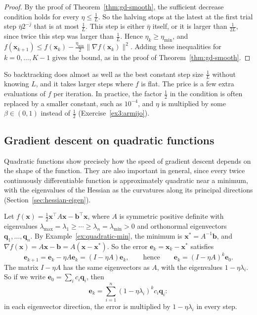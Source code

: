 \documentclass[11pt]{article}
\newcommand{\norm}[1]{\lVert #1 \rVert}
\theoremstyle{definition}
\theoremstyle{plain}
\theoremstyle{remark}
\begin{document}
\begin{proof}
    By the proof of Theorem~\ref{thm:gd-smooth}, the sufficient decrease condition holds for every $\eta \leq \frac{1}{L}$. So the halving stops at the latest at the first trial step $\bar\eta2^{-j}$ that is at most $\frac{1}{L}$. This step is either $\bar\eta$ itself, or it is larger than $\frac{1}{2L}$, since twice this step was larger than $\frac{1}{L}$. Hence $\eta_k \geq \eta_{\min}$, and $f(\mathbf{x}_{k+1}) \leq f(\mathbf{x}_k) - \frac{\eta_{\min}}{2}\norm{\nabla f(\mathbf{x}_k)}^2$. Adding these inequalities for $k = 0, \ldots, K - 1$ gives the bound, as in the proof of Theorem~\ref{thm:gd-smooth}.
\end{proof}

So backtracking does almost as well as the best constant step size $\frac{1}{L}$ without knowing $L$, and it takes larger steps where $f$ is flat. The price is a few extra evaluations of $f$ per iteration. In practice, the factor $\frac{1}{2}$ in the condition is often replaced by a smaller constant, such as $10^{-4}$, and $\eta$ is multiplied by some $\beta \in (0, 1)$ instead of $\frac{1}{2}$ (Exercise~\ref{ex3:armijo}).

\subsection{Gradient descent on quadratic functions}

Quadratic functions show precisely how the speed of gradient descent depends on the shape of the function. They are also important in general, since every twice continuously differentiable function is approximately quadratic near a minimum, with the eigenvalues of the Hessian as the curvatures along its principal directions (Section~\ref{sec:hessian-eigen}).

Let $f(\mathbf{x}) = \frac{1}{2}\mathbf{x}^\top A\mathbf{x} - \mathbf{b}^\top\mathbf{x}$, where $A$ is symmetric positive definite with eigenvalues $\lambda_{\max} = \lambda_1 \geq \cdots \geq \lambda_n = \lambda_{\min} > 0$ and orthonormal eigenvectors $\mathbf{q}_1, \ldots, \mathbf{q}_n$. By Example~\ref{ex:quadratic-min}, the minimum is $\mathbf{x}^* = A^{-1}\mathbf{b}$, and $\nabla f(\mathbf{x}) = A\mathbf{x} - \mathbf{b} = A(\mathbf{x} - \mathbf{x}^*)$. So the error $\mathbf{e}_k = \mathbf{x}_k - \mathbf{x}^*$ satisfies
\[\mathbf{e}_{k+1} = \mathbf{e}_k - \eta A\mathbf{e}_k = (I - \eta A)\mathbf{e}_k, \qquad \text{hence} \qquad \mathbf{e}_k = (I - \eta A)^k \mathbf{e}_0.\]
The matrix $I - \eta A$ has the same eigenvectors as $A$, with the eigenvalues $1 - \eta\lambda_i$. So if we write $\mathbf{e}_0 = \sum_i c_i\mathbf{q}_i$, then
\[\mathbf{e}_k = \sum_{i=1}^n (1 - \eta\lambda_i)^k c_i \mathbf{q}_i:\]
in each eigenvector direction, the error is multiplied by $1 - \eta\lambda_i$ in every step.
\end{document}
